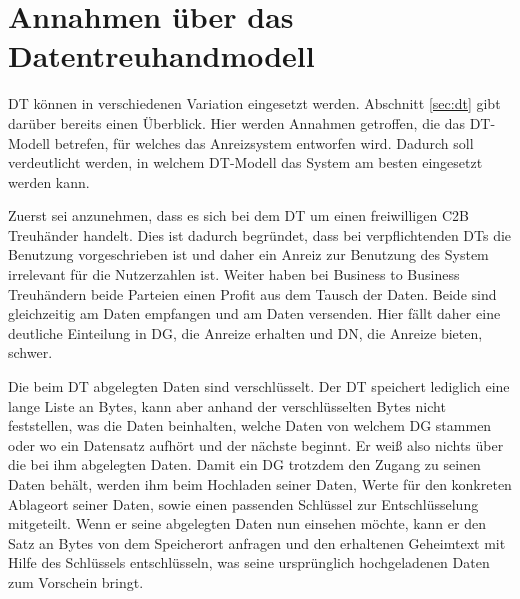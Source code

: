 \documentclass[
	fontsize=11pt,
	headings=small,
	parskip=half,           %
	bibliography=totoc,
	numbers=noenddot,       %
	open=any,               %
]{scrreprt}
\begin{document}
\section{Annahmen über das Datentreuhandmodell}
\label{sec:systemAssumptions}
DT können in verschiedenen Variation eingesetzt werden. Abschnitt \ref{sec:dt} gibt darüber bereits einen Überblick. Hier werden Annahmen getroffen, die das DT-Modell betrefen, für welches das Anreizsystem entworfen wird. Dadurch soll verdeutlicht werden, in welchem DT-Modell das System am besten eingesetzt werden kann.

Zuerst sei anzunehmen, dass es sich bei dem DT um einen freiwilligen C2B Treuhänder handelt. Dies ist dadurch begründet, dass bei verpflichtenden DTs die Benutzung vorgeschrieben ist und daher ein Anreiz zur Benutzung des System irrelevant für die Nutzerzahlen ist. Weiter haben bei Business to Business Treuhändern beide Parteien einen Profit aus dem Tausch der Daten. Beide sind gleichzeitig am Daten empfangen und am Daten versenden. Hier fällt daher eine deutliche Einteilung in DG, die Anreize erhalten und DN, die Anreize bieten, schwer. 

Die beim DT abgelegten Daten sind verschlüsselt. Der DT speichert lediglich eine lange Liste an Bytes, kann aber anhand der verschlüsselten Bytes nicht feststellen, was die Daten beinhalten, welche Daten von welchem DG stammen oder wo ein Datensatz aufhört und der nächste beginnt. Er weiß also nichts über die bei ihm abgelegten Daten. Damit ein DG trotzdem den Zugang zu seinen Daten behält, werden ihm beim Hochladen seiner Daten, Werte für den konkreten Ablageort seiner Daten, sowie einen passenden Schlüssel zur Entschlüsselung mitgeteilt. Wenn er seine abgelegten Daten nun einsehen möchte, kann er den Satz an Bytes von dem Speicherort anfragen und den erhaltenen Geheimtext mit Hilfe des Schlüssels entschlüsseln, was seine ursprünglich hochgeladenen Daten zum Vorschein bringt.
\end{document}
